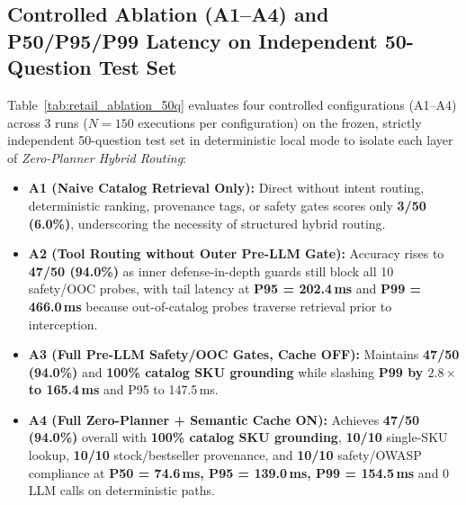 \subsection*{Controlled Ablation (A1--A4) and P50/P95/P99 Latency on Independent 50-Question Test Set}
Table~\ref{tab:retail_ablation_50q} evaluates four controlled configurations (A1--A4) across 3 runs ($N=150$ executions per configuration) on the frozen, strictly independent 50-question test set in deterministic local mode to isolate each layer of \emph{Zero-Planner Hybrid Routing}:
\begin{itemize}
    \item \textbf{A1 (Naive Catalog Retrieval Only):} Direct  without intent routing, deterministic ranking, provenance tags, or safety gates scores only \textbf{3/50 (6.0\%)}, underscoring the necessity of structured hybrid routing.
    \item \textbf{A2 (Tool Routing without Outer Pre-LLM Gate):} Accuracy rises to \textbf{47/50 (94.0\%)} as inner defense-in-depth guards still block all 10 safety/OOC probes, with tail latency at \textbf{P95 = 202.4\,ms} and \textbf{P99 = 466.0\,ms} because out-of-catalog probes traverse retrieval prior to interception.
    \item \textbf{A3 (Full Pre-LLM Safety/OOC Gates, Cache OFF):} Maintains \textbf{47/50 (94.0\%)} and \textbf{100\% catalog SKU grounding} while slashing \textbf{P99 by $2.8\times$ to 165.4\,ms} and P95 to 147.5\,ms.
    \item \textbf{A4 (Full Zero-Planner + Semantic Cache ON):} Achieves \textbf{47/50 (94.0\%)} overall with \textbf{100\% catalog SKU grounding}, \textbf{10/10} single-SKU lookup, \textbf{10/10} stock/bestseller provenance, and \textbf{10/10} safety/OWASP compliance at \textbf{P50 = 74.6\,ms, P95 = 139.0\,ms, P99 = 154.5\,ms} and 0 LLM calls on deterministic paths.
\end{itemize}

